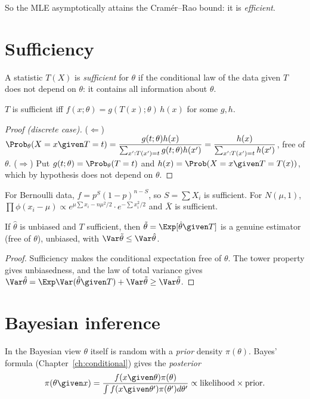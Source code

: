 So the MLE asymptotically attains the Cram\'er--Rao bound: it is \emph{efficient}.

\section{Sufficiency}

A statistic $T(X)$ is \emph{sufficient} for $\theta$ if the conditional law of the data given $T$
does not depend on $\theta$: it contains all information about $\theta$.

\begin{theorem}
$T$ is sufficient iff $f(x;\theta)=g(T(x);\theta)\,h(x)$ for some $g,h$.
\end{theorem}
\begin{proof}[Proof (discrete case)]
($\Leftarrow$) $\Prob_\theta(X=x\given T=t)=\dfrac{g(t;\theta)h(x)}{\sum_{x':T(x')=t}g(t;\theta)h(x')}=\dfrac{h(x)}{\sum_{x':T(x')=t}h(x')}$,
free of $\theta$. ($\Rightarrow$) Put $g(t;\theta)=\Prob_\theta(T=t)$ and $h(x)=\Prob(X=x\given T=T(x))$, which by
hypothesis does not depend on $\theta$.
\end{proof}

\begin{example}
For Bernoulli data, $f=p^S(1-p)^{n-S}$, so $S=\sum X_i$ is sufficient. For $N(\mu,1)$,
$\prod\phi(x_i-\mu)\propto e^{\mu\sum x_i-n\mu^2/2}\cdot e^{-\sum x_i^2/2}$ and $\bar X$ is sufficient.
\end{example}

\begin{theorem}
If $\hat\theta$ is unbiased and $T$ sufficient, then $\tilde\theta=\Exp[\hat\theta\given T]$ is a genuine
estimator (free of $\theta$), unbiased, with $\Var\tilde\theta\le\Var\hat\theta$.
\end{theorem}
\begin{proof}
Sufficiency makes the conditional expectation free of $\theta$. The tower property gives
unbiasedness, and the law of total variance gives
$\Var\hat\theta=\Exp\Var(\hat\theta\given T)+\Var\tilde\theta\ge\Var\tilde\theta$.
\end{proof}

\section{Bayesian inference}

In the Bayesian view $\theta$ itself is random with a \emph{prior} density $\pi(\theta)$. Bayes' formula
(Chapter~\ref{ch:conditional}) gives the \emph{posterior}
\[
\pi(\theta\given x)=\frac{f(x\given\theta)\pi(\theta)}{\int f(x\given\theta')\pi(\theta')d\theta'}\propto\text{likelihood}\times\text{prior}.
\]

